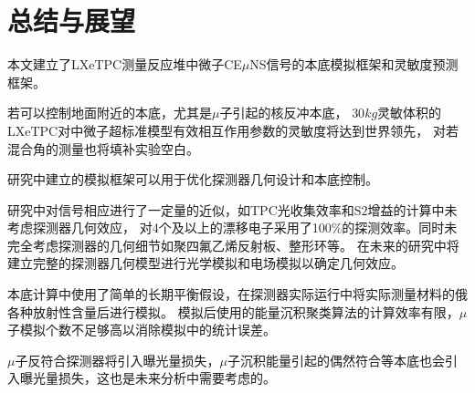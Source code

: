 
\chapter{总结与展望}

本文建立了LXeTPC测量反应堆中微子CE$\mu$NS信号的本底模拟框架和灵敏度预测框架。

若可以控制地面附近的本底，尤其是$\mu$子引起的核反冲本底，
$30\si{kg}$灵敏体积的LXeTPC对中微子超标准模型有效相互作用参数的灵敏度将达到世界领先，
对若混合角的测量也将填补实验空白。

研究中建立的模拟框架可以用于优化探测器几何设计和本底控制。

研究中对信号相应进行了一定量的近似，如TPC光收集效率和$\mathrm{S2}$增益的计算中未考虑探测器几何效应，
对4个及以上的漂移电子采用了100\%的探测效率。同时未完全考虑探测器的几何细节如聚四氟乙烯反射板、整形环等。
在未来的研究中将建立完整的探测器几何模型进行光学模拟和电场模拟以确定几何效应。

本底计算中使用了简单的长期平衡假设，在探测器实际运行中将实际测量材料的俄各种放射性含量后进行模拟。
模拟后使用的能量沉积聚类算法的计算效率有限，$\mu$子模拟个数不足够高以消除模拟中的统计误差。

$\mu$子反符合探测器将引入曝光量损失，$\mu$子沉积能量引起的偶然符合等本底也会引入曝光量损失，这也是未来分析中需要考虑的。
